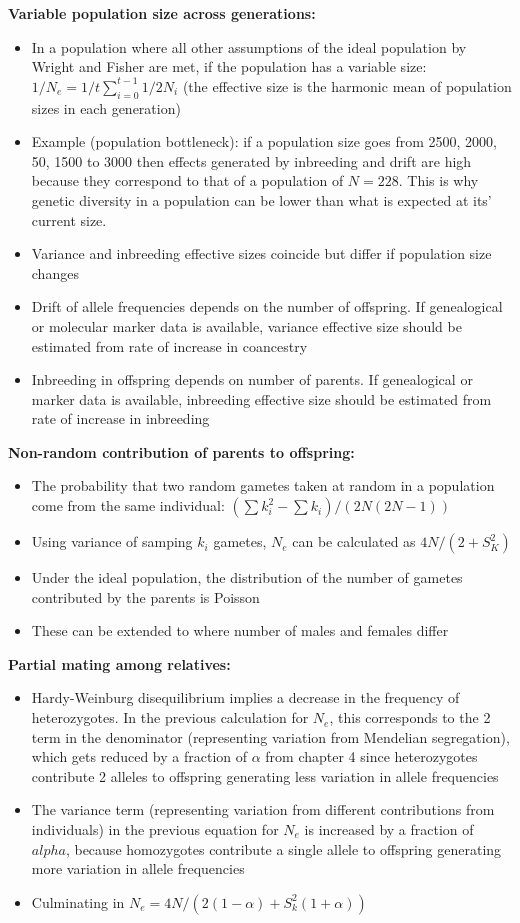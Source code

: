 \documentclass[12pt]{amsart}
\begin{document}
{\large \bf Variable population size across generations:}
\begin{itemize}
\item In a population where all other assumptions of the ideal population by Wright and Fisher are met, if the population has a variable size:  $1/N_e = 1/t\sum_{i=0}^{t-1}1/2N_i$ (the effective size is the harmonic mean of population sizes in each generation)  
\item Example (population bottleneck): if a population size goes from 2500, 2000, 50, 1500 to 3000 then effects generated by inbreeding and drift are high because they correspond to that of a population of $N = 228$. This is why genetic diversity in a population can be lower than what is expected at its' current size.
\item Variance and inbreeding effective sizes coincide but differ if population size changes
\item Drift of allele frequencies depends on the number of offspring. If genealogical or molecular marker data is available, variance effective size should be estimated from rate of increase in coancestry
\item Inbreeding in offspring depends on number of parents. If genealogical or marker data is available, inbreeding effective size should be estimated from rate of increase in inbreeding
\end{itemize}

{\large \bf Non-random contribution of parents to offspring:}
\begin{itemize}
\item The probability that two random gametes taken at random in a population come from the same individual: $(\sum k_i^2 - \sum k_i) / (2N(2N-1))$
\item Using variance of samping $k_i$ gametes, $N_e$ can be calculated as $4N / (2+S_K^2)$
\item Under the ideal population, the distribution of the number of gametes contributed by the parents is Poisson
\item These can be extended to where number of males and females differ  
\end{itemize}

{\large \bf Partial mating among relatives:}
\begin{itemize}
\item Hardy-Weinburg disequilibrium implies a decrease in the frequency of heterozygotes. In the previous calculation for $N_e$, this corresponds to the 2 term in the denominator (representing variation from Mendelian segregation), which gets reduced by a fraction of $\alpha$ from chapter 4 since heterozygotes contribute 2 alleles to offspring generating less variation in allele frequencies
\item The variance term (representing variation from different contributions from individuals) in the previous equation for $N_e$ is increased by a fraction of $alpha$, because homozygotes contribute a single allele to offspring generating more variation in allele frequencies 
\item Culminating in $N_e = 4N / (2(1-\alpha) + S_k^2(1+\alpha))$
\end{itemize}
\end{document}
